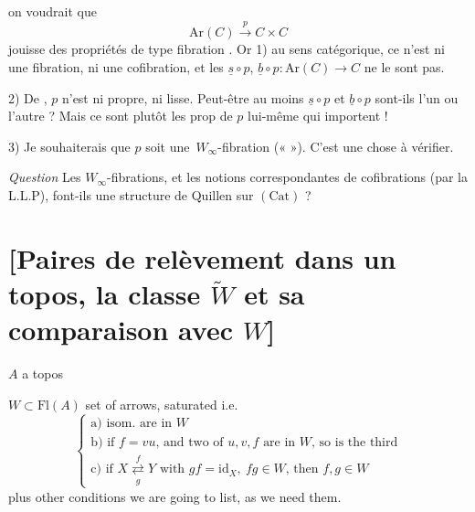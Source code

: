 \documentclass[11pt,a4paper]{article}
\begin{document}

 on voudrait que
\[
  \mathrm{Ar}(C) \xrightarrow{\ p\ } C \times C
\]
jouisse des propriétés de type fibration \struck{\ill{}}. Or
1) au sens catégorique, ce n'est ni une fibration, ni une cofibration, et
\ill{} les  
$\underline{s} \circ p$, $\underline{b} \circ p : \mathrm{Ar}(C) \to C$
ne le sont pas.

2) De \ill{}, \struck{\ill{}} $p$ n'est ni  propre, ni
 lisse. Peut-être au moins \struck{\ill{}}
$\underline{s} \circ p$ et $\underline{b} \circ p$ \struck{\ill{}}
sont-ils \struck{\ill{}} l'un ou l'autre ? Mais ce sont plutôt les
prop de $p$ lui-même qui importent !

3) Je souhaiterais que $p$ soit une \struck{\ill{}}\,$W_\infty$-fibration
(«  »). C'est une chose à vérifier.

\emph{Question} Les $W_\infty$-fibrations, et les notions correspondantes de
cofibrations (par la L.L.P), \struck{\ill{}} font-ils une
 structure de Quillen sur $(\mathrm{Cat})$ ?

\section{[Paires de relèvement dans un topos, la classe $\widetilde{W}$ et sa comparaison avec $W$]}

$A$ a topos

$W \subset \mathrm{Fl}(A)$ set of arrows,  saturated
i.e.
\[
  \left\{
  \begin{array}{l}
    \text{a) isom. are in } W \\
    \text{b) if } f = vu \text{, and two of } u, v, f \text{ are in } W \text{, so is the third} \\
    \text{c) if } X \underset{g}{\overset{f}{\rightleftarrows}} Y \text{ with } gf = \mathrm{id}_X,\ fg \in W \text{, then } f, g \in W
  \end{array}
  \right.
\]
plus other conditions we are going to list, as we need them.
\end{document}

